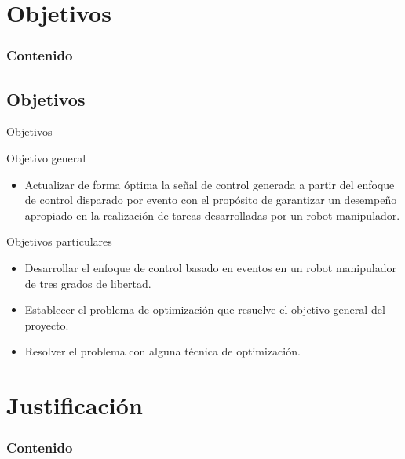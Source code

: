 {%
\section{Objetivos}{
	\begin{frame}
		\frametitle{Contenido}
	\end{frame}
\subsection{Objetivos}
\begin{frame}[shrink=20]{Objetivos}
\begin{block}{Objetivo general}
	\begin{itemize}
		\justifying
		\item Actualizar de forma óptima la señal de control generada a partir del enfoque de control disparado por evento con el propósito de garantizar un desempeño apropiado en la realización de tareas desarrolladas por un robot manipulador.
	\end{itemize}
\end{block}
\begin{block}{Objetivos particulares}
	\justifying
	\begin{itemize}
		\item Desarrollar el enfoque de control basado en eventos en un robot manipulador de tres grados de libertad.
		\item Establecer el problema de optimización que resuelve el objetivo general del proyecto.
		\item Resolver el problema con alguna técnica de optimización.
	\end{itemize}
\end{block}
\end{frame}

\section{Justificación}{
	\begin{frame}
		\frametitle{Contenido}
	\end{frame}
}}}
